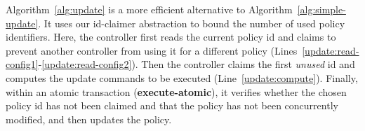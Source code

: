 \documentclass[conference]{sigcomm-alternate}
\newcommand{\hide}[1]{}
\newcommand{\petr}[1]{\textit{\textcolor{blue}{[petr]: #1}}} %
\newcommand{\execatomic}{\textbf{execute-atomic}}
\begin{document}

Algorithm~\ref{alg:update} is a more efficient alternative 
to Algorithm~\ref{alg:simple-update}. It uses our id-claimer abstraction
to bound the number of used policy identifiers.
Here, the controller first reads the current policy id and claims to prevent another controller from using it 
for a
different policy (Lines~\ref{update:read-config1}-\ref{update:read-config2}).
Then the controller claims the first \emph{unused} id and computes the update commands to be executed (Line~\ref{update:compute}).
Finally, within an atomic transaction (\textbf{\execatomic}), it verifies whether the chosen policy id has not
been claimed and that
the policy has not been concurrently modified, and then updates the policy.


\hide{
We compute our new suggested policy by applying the update requests on
top of current policy, supporting any kind of requests and
policies. Then we make a transaction (using the bundle feature) to
atomically check that our policy id is not blocked by another controller, to change the current policy id to ours (an action that would fail if the current policy id is no longer what we are counting of) and to actually configure our new policy.

If one of the actions in the transaction fails we try again. There is no progress guaranty for each controller but there is one for the whole system - at least one of the controller will succeed in fulfilling its update requirements.
}
\end{document}

